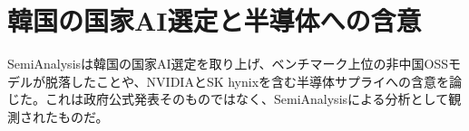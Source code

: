 \section{韓国の国家AI選定と半導体への含意}
SemiAnalysisは韓国の国家AI選定を取り上げ、ベンチマーク上位の非中国OSSモデルが脱落したことや、NVIDIAとSK hynixを含む半導体サプライへの含意を論じた。これは政府公式発表そのものではなく、SemiAnalysisによる分析として観測されたものだ。
